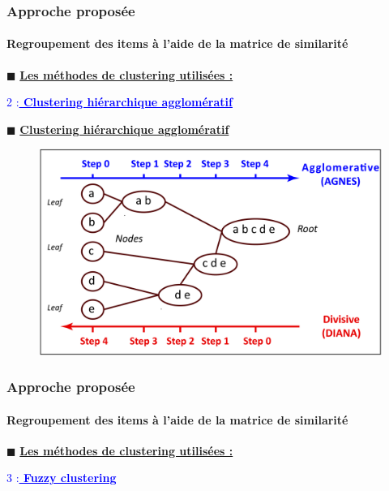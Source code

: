 \documentclass[aspectratio=169,professionalfonts, 12pt]{beamer}
\begin{document}
\begin{frame}
  \frametitle{Approche proposée}
  \framesubtitle{Regroupement des items à l’aide de la matrice de similarité}
  \(\displaystyle \blacksquare \) \textbf{\underline{Les méthodes de clustering utilisées :}} \\
  \justifying 
  \begin{minipage}{\textwidth}
    \vspace{2em}
  \hspace{3em} \textcolor{blue}{ 2 :\textbf{\underline{ Clustering hiérarchique agglomératif}}}
  \end{minipage}
\end{frame}

\begin{frame}
  \(\displaystyle \blacksquare \) \textbf{\underline{Clustering hiérarchique agglomératif}} \\
  \justifying 
  \begin{minipage}{\textwidth}
    \begin{figure}[H]
      \begin{center}
        \includegraphics[scale=0.18]{images/contribution/hierarchical_agglo_divisive.png}
      \end{center}
    \end{figure}
  \end{minipage}
\end{frame}

\begin{frame}
  \frametitle{Approche proposée}
  \framesubtitle{Regroupement des items à l’aide de la matrice de similarité}
  \(\displaystyle \blacksquare \) \textbf{\underline{Les méthodes de clustering utilisées :}} \\
  \justifying 
  \begin{minipage}{\textwidth}
    \vspace{2em}
  \hspace{3em} \textcolor{blue}{ 3 :\textbf{\underline{ Fuzzy clustering}}}
  \end{minipage}
\end{frame}
\end{document}
